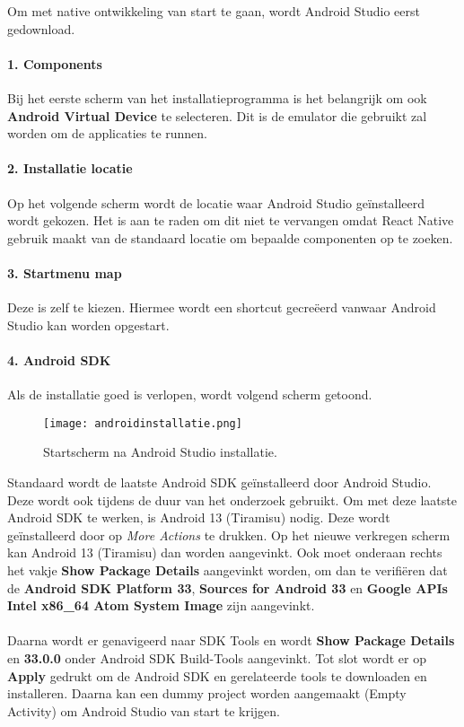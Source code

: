 Om met native ontwikkeling van start te gaan, wordt Android Studio eerst gedownload. 

\paragraph{1. Components}
Bij het eerste scherm van het installatieprogramma is het belangrijk om ook 
\textbf{Android Virtual Device} te selecteren. Dit is de emulator die gebruikt 
zal worden om de applicaties te runnen.

\paragraph{2. Installatie locatie}
Op het volgende scherm wordt de locatie waar Android Studio geïnstalleerd wordt gekozen. 
Het is aan te raden om dit niet te vervangen omdat React Native gebruik maakt van de standaard 
locatie om bepaalde componenten op te zoeken. 

\paragraph{3. Startmenu map}
Deze is zelf te kiezen. Hiermee wordt een shortcut gecreëerd vanwaar Android Studio kan worden opgestart.

\paragraph{4. Android SDK}\label{par:sdk}
Als de installatie goed is verlopen, wordt volgend scherm getoond. 
\begin{figure}[H]
    \centering
    \texttt{[image: androidinstallatie.png]}
    \caption{Startscherm na Android Studio installatie.}
\end{figure}
Standaard wordt de laatste Android SDK geïnstalleerd door Android Studio. 
Deze wordt ook tijdens de duur van het onderzoek gebruikt. 
Om met deze laatste Android SDK te werken, is Android 13 (Tiramisu) nodig. 
Deze wordt geïnstalleerd door op \textit{More Actions} te drukken. Op het nieuwe verkregen scherm 
kan Android 13 (Tiramisu) dan worden aangevinkt. Ook moet onderaan rechts het vakje 
\textbf{Show Package Details} aangevinkt worden, om dan te verifiëren dat de 
\textbf{Android SDK Platform 33}, \textbf{Sources for Android 33} en 
\textbf{Google APIs Intel x86\_64 Atom System Image} zijn aangevinkt.
\\\\
Daarna wordt er genavigeerd naar SDK Tools en wordt \textbf{Show Package Details} 
en \textbf{33.0.0} onder Android SDK Build-Tools aangevinkt. 
Tot slot wordt er op \textbf{Apply} gedrukt om de Android SDK en gerelateerde tools te downloaden en installeren.
Daarna kan een dummy project worden aangemaakt (Empty Activity) om Android Studio van start te krijgen.

